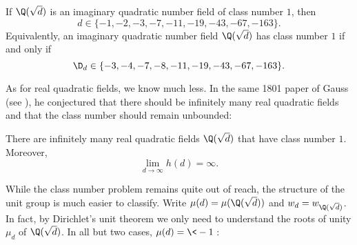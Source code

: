     \begin{theorem}
      If $\Q(\sqrt{d})$ is an imaginary quadratic number field of class number $1$, then
      \[
        d \in \{-1,-2,-3,-7,-11,-19,-43,-67,-163\}.
      \]
      Equivalently, an imaginary quadratic number field $\Q(\sqrt{d})$ has class number $1$ if and only if
      \[
        \D_{d} \in \{-3,-4,-7,-8,-11,-19,-43,-67,-163\}.
      \]
    \end{theorem}

    As for real quadratic fields, we know much less. In the same 1801 paper of Gauss (see \cite{gauss1801disquisitiones}), he conjectured that there should be infinitely many real quadratic fields and that the class number should remain unbounded:

    \begin{conjecture}
      There are infinitely many real quadratic fields $\Q(\sqrt{d})$ that have class number $1$. Moreover,
      \[
        \lim_{d \to \infty}h(d) = \infty.
      \]
    \end{conjecture}

    While the class number problem remains quite out of reach, the structure of the unit group is much easier to classify. Write $\mu(d) = \mu(\Q(\sqrt{d}))$ and $w_{d} = w_{\Q(\sqrt{d})}$. In fact, by Dirichlet's unit theorem we only need to understand the roots of unity $\mu_{d}$ of $\Q(\sqrt{d})$. In all but two cases, $\mu(d) = \<-1\>$:

